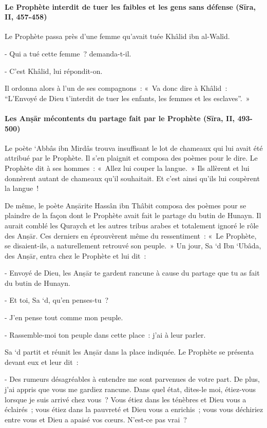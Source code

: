 \paragraph{Le Prophète interdit de tuer les faibles et les gens sans défense (Sīra,
II, 457-458)}

{Le Prophète passa près d'une femme qu'avait tuée Khâlid ibn
al-Walîd.}

{- Qui a tué cette femme~? demanda-t-il.}

{- C'est Khâlid, lui répondit-on.}

{Il ordonna alors à l'un de ses compagnons~: «~Va donc dire à
Khâlid~:~ ``L'Envoyé de Dieu t'interdit de tuer les enfants, les femmes
et les esclaves''.~»}

\paragraph{Les Anṣār mécontents du partage fait par le Prophète (Sīra, II, 493-500)}

{Le poète `Abbâs ibn Mirdâs trouva insuffisant le lot de chameaux
qui lui avait été attribué par le Prophète. Il s'en plaignit et composa
des poèmes pour le dire. Le Prophète dit à ses hommes~: «~Allez lui
couper la langue.~» Ils allèrent et lui donnèrent autant de chameaux
qu'il souhaitait. Et c'est ainsi qu'ils lui coupèrent la langue~!}

{De même, le poète Anṣārite Hassân ibn Thâbit composa des poèmes
pour se plaindre de la façon dont le Prophète avait fait le partage du
butin de Hunayn. Il aurait comblé les Quraych et les autres tribus
arabes et totalement ignoré le rôle des Anṣār. Ces derniers en
éprouvèrent même du ressentiment~: «~Le Prophète, se disaient-ils, a
naturellement retrouvé son peuple.~» Un jour, Sa `d Ibn `Ubâda, des
Anṣār, entra chez le Prophète et lui dit~:}

{- Envoyé de Dieu, les Anṣār te gardent rancune à cause du partage
que tu as fait du butin de Hunayn.}

{- Et toi, Sa `d, qu'en penses-tu~?}

{- J'en pense tout comme mon peuple.}

{- Rassemble-moi ton peuple dans cette place~: j'ai à leur parler.}

{Sa `d partit et réunit les Anṣār dans la place indiquée. Le
Prophète se présenta devant eux et leur dit~:}

{- Des rumeurs désagréables à entendre me sont parvenues de votre
part. De plus, j'ai appris que vous me gardiez rancune. Dans quel état,
dites-le moi, étiez-vous lorsque je suis arrivé chez vous~? Vous étiez
dans les ténèbres et Dieu vous a éclairés~; vous étiez dans la pauvreté
et Dieu vous a enrichis~; vous vous déchiriez entre vous et Dieu a
apaisé vos cœurs. N'est-ce pas vrai~?}


